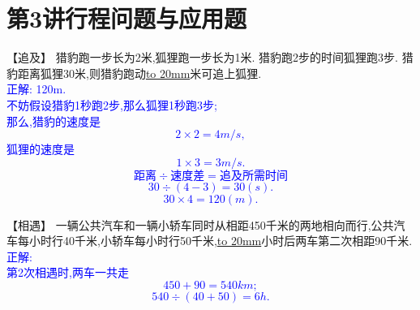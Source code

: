 \section{第3讲\quad 行程问题与应用题}

\item {
    【追及】
    猎豹跑一步长为2米,狐狸跑一步长为1米. 猎豹跑2步的时间狐狸跑3步. 猎豹距离狐狸30米,则猎豹跑动\underline{\hbox to 20mm{}}米可追上狐狸. 
    \ifshowSolution 
        \fangsong{}\textcolor{blue}{
            \\正解: 120m.\\
                不妨假设猎豹1秒跑2步,那么狐狸1秒跑3步;\\
                那么,猎豹的速度是 \[2\times 2 = 4m/s,\] 
                狐狸的速度是 
                \[1\times 3 = 3 m/s.\]
                \[距离\div 速度差 = 追及所需时间\]
                \[30\div (4-3) = 30(s). \]
                \[30 \times 4 = 120 (m).\]
        }
    \else
        \vspace{2cm}
    \fi
}

\item {
    【相遇】
    一辆公共汽车和一辆小轿车同时从相距450千米的两地相向而行,公共汽车每小时行40千米,小轿车每小时行50千米,\underline{\hbox to 20mm{}}小时后两车第二次相距90千米. 
    \ifshowSolution 
        \fangsong{}\textcolor{blue}{
            \\正解: \\
                第2次相遇时,两车一共走 \[450+90=540 km;\]
                \[540\div (40+50) = 6h.\]
        }
    \else
        \vspace{2cm}
    \fi
}

